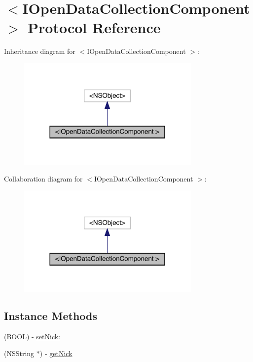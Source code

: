 \hypertarget{protocol_i_open_data_collection_component_01-p}{}\section{$<$I\+Open\+Data\+Collection\+Component $>$ Protocol Reference}
\label{protocol_i_open_data_collection_component_01-p}


Inheritance diagram for $<$I\+Open\+Data\+Collection\+Component $>$\+:\nopagebreak
\begin{figure}[H]
\begin{center}
\leavevmode
\includegraphics[width=254pt]{protocol_i_open_data_collection_component_01-p__inherit__graph}
\end{center}
\end{figure}


Collaboration diagram for $<$I\+Open\+Data\+Collection\+Component $>$\+:\nopagebreak
\begin{figure}[H]
\begin{center}
\leavevmode
\includegraphics[width=254pt]{protocol_i_open_data_collection_component_01-p__coll__graph}
\end{center}
\end{figure}
\subsection*{Instance Methods}
\begin{DoxyCompactItemize}
\item 
(B\+O\+OL) -\/ \mbox{\hyperlink{protocol_i_open_data_collection_component_01-p_a6c4f1662e97a2074c7e6f2fa9cb2ed9c}{set\+Nick\+:}}
\item 
(N\+S\+String $\ast$) -\/ \mbox{\hyperlink{protocol_i_open_data_collection_component_01-p_a375d70c4b83bacf2c45f20976ee21a35}{get\+Nick}}
\end{DoxyCompactItemize}


